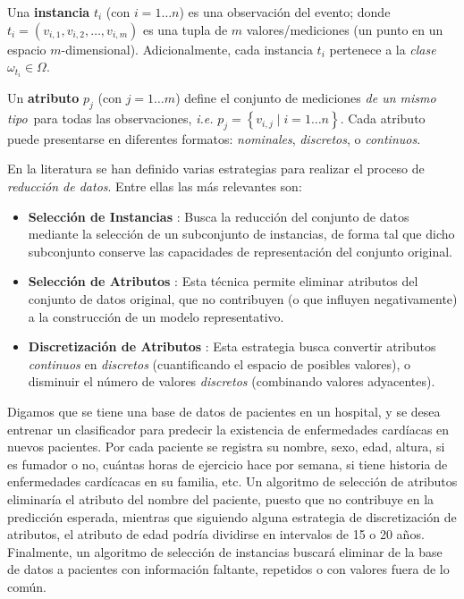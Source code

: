 \begin{definicion}
Una \textbf{instancia} $t_i$ (con $i = 1\dots n$) es una observación del evento; donde $t_i = (v_{i,1}, v_{i,2}, \dots, v_{i,m})$ es una tupla de $m$ valores/mediciones (un punto en un espacio $m$-dimensional). Adicionalmente, cada instancia $t_i$ pertenece a la \emph{clase} $\omega_{t_i} \in \Omega$.\\
\end{definicion}

\begin{definicion}
Un \textbf{atributo} $p_j$ (con $j = 1\dots m$) define el conjunto de mediciones \guillemotleft\emph{de un mismo tipo}\guillemotright\ para todas las observaciones, \emph{i.e.} $p_j = \left\{ v_{i,j} \mid i = 1\dots n \right\}$. Cada atributo puede presentarse en diferentes formatos: \emph{nominales}, \emph{discretos}, o \emph{continuos}.
\end{definicion}

En la literatura se han definido varias estrategias para realizar el proceso de \emph{reducción de datos}. Entre ellas las más relevantes son:

\begin{itemize}
\item \textbf{Selección de Instancias}
\cite{DBLP:journals/ai/BlumL97,Liu:2002:IIS:593433.593525}: Busca la reducción del conjunto de datos mediante la selección de un subconjunto de instancias, de forma tal que dicho subconjunto conserve las capacidades de representación del conjunto original.
\item \textbf{Selección de Atributos}
\cite{DBLP:journals/ai/BlumL97, Liu:1998:FEC:551943}: Esta técnica permite eliminar atributos del conjunto de datos original, que no contribuyen (o que influyen negativamente) a la construcción de un modelo representativo.
\item \textbf{Discretización de Atributos}
\cite{DBLP:conf/ijcai/FayyadI93, Liu:2002:DET:593435.593535}: Esta estrategia busca convertir atributos \emph{continuos} en \emph{discretos} (cuantificando el espacio de posibles valores), o disminuir el número de valores \emph{discretos} (combinando valores adyacentes).
\end{itemize}

Digamos que se tiene una base de datos de pacientes en un hospital, y se desea entrenar un clasificador para predecir la existencia de enfermedades cardíacas en nuevos pacientes. Por cada paciente se registra su nombre, sexo, edad, altura, si es fumador o no, cuántas horas de ejercicio hace por semana, si tiene historia de enfermedades cardícacas en su familia, etc. Un algoritmo de selección de atributos eliminaría el atributo del nombre del paciente, puesto que no contribuye en la predicción esperada, mientras que siguiendo alguna estrategia de discretización de atributos, el atributo de edad podría dividirse en intervalos de 15 o 20 años. Finalmente, un algoritmo de selección de instancias buscará eliminar de la base de datos a pacientes con información faltante, repetidos o con valores fuera de lo común.


